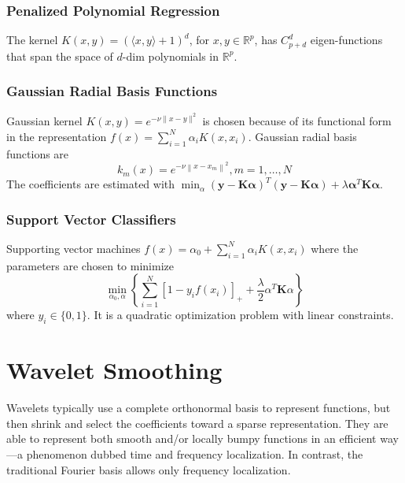 \subsubsection{Penalized Polynomial Regression}
The kernel $K(x,y)=(\langle x,y\rangle+1)^d$, for $x,y\in\mathbb{R}^p$, has $C_{p+d}^d$
eigen-functions that span the space of $d$-dim polynomials in $\mathbb{R}^p$. 


\subsubsection{Gaussian Radial Basis Functions}
Gaussian kernel $K(x, y)=e^{-\nu\|x-y\|^{2}}$ is chosen because of its functional form in 
the representation $f(x)=\sum_{i=1}^{N} \alpha_{i} K\left(x, x_{i}\right)$. Gaussian radial
basis functions are
\begin{equation*}
    k_{m}(x)=e^{-\nu\left\|x-x_{m}\right\|^{2}}, m=1, \ldots, N
\end{equation*}
The coefficients are estimated with $\min _{\alpha}(\mathbf{y}-\mathbf{K} \boldsymbol{\alpha})^{T}(\mathbf{y}-\mathbf{K} 
\boldsymbol{\alpha})+\lambda \boldsymbol{\alpha}^{T} \mathbf{K} \boldsymbol{\alpha}$. 

\subsubsection{Support Vector Classifiers}
Supporting vector machines 
$f(x)=\alpha_{0}+\sum_{i=1}^{N} \alpha_{i} K\left(x, x_{i}\right)$ where the parameters are
chosen to minimize
\begin{equation*}
    \min _{\alpha_{0}, \alpha}\left\{\sum_{i=1}^{N}\left[1-y_{i} f\left(x_{i}\right)\right]_{+}
    +\frac{\lambda}{2} \alpha^{T} \mathbf{K} \alpha\right\}
\end{equation*}
where $y_i\in\{0,1\}$. It is a quadratic optimization problem with linear constraints. 

\section{Wavelet Smoothing}
Wavelets typically use a complete orthonormal basis to represent functions,
but then shrink and select the coefficients toward a sparse representation.
They are able to represent both
smooth and/or locally bumpy functions in an efficient way—a phenomenon
dubbed time and frequency localization. In contrast, the traditional Fourier
basis allows only frequency localization.

